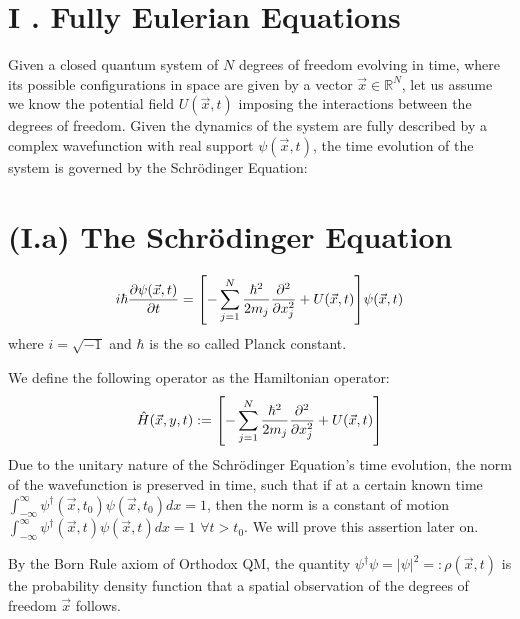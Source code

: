 \documentclass[11pt, a4paper]{article} %
\newcommand{\R}{\mathbb{R}} %
\begin{document}
\section*{I . Fully Eulerian Equations}
Given a closed quantum system of $N$ degrees of freedom evolving in time, where its possible configurations in space are given by a vector $\vec{x}\in\R^N$, let us assume we know the potential field $U(\vec{x}, t)$ imposing the interactions between the degrees of freedom. Given the dynamics of the system are fully described by a complex wavefunction with real support $\psi(\vec{x},t)$, the time evolution of the system is governed by the Schrödinger Equation:

\section*{(I.a) The Schrödinger Equation}
\begin{equation}\label{SE}
i\hbar \pdv{\psi(\vec{x},t)}{t} = \qty[-\sum_{j=1}^N\frac{\hbar^2}{2m_j}\pdv[2]{}{x_j} + U(\vec{x},t)]\psi(\vec{x},t)
\end{equation}
where $i=\sqrt{-1}$ and $\hbar$ is the so called Planck constant.

We define the following operator as the Hamiltonian operator:
\begin{equation}
\hat{H}(\vec{x}, y, t):=\qty[-\sum_{j=1}^N\frac{\hbar^2}{2m_j}\pdv[2]{}{x_j} + U(\vec{x},t)]
\end{equation}
Due to the unitary nature of the Schrödinger Equation's time evolution, the norm of the wavefunction is preserved in time, such that if at a certain known time $\int^\infty_{-\infty} \psi^\dagger(\vec{x},t_0)\psi(\vec{x},t_0)dx=1$, then the norm is a constant of motion $\int^\infty_{-\infty} \psi^\dagger(\vec{x},t)\psi(\vec{x},t)dx=1$ $\forall t>t_0$. We will prove this assertion later on.

By the Born Rule axiom of Orthodox QM, the quantity $\psi^\dagger\psi=|\psi|^2=:\rho(\vec{x},t)$ is the probability density function that a spatial observation of the degrees of freedom $\vec{x}$ follows.
\end{document}
